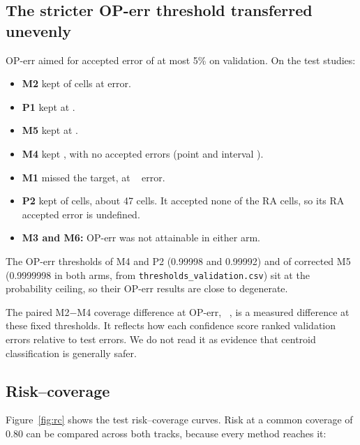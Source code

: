\documentclass[11pt]{article}
\begin{document}
\subsection{The stricter OP-err threshold transferred unevenly}

OP-err aimed for accepted error of at most 5\% on validation. On the test studies:
\begin{itemize}
\item \textbf{M2} kept  of cells at  error.
\item \textbf{P1} kept  at .
\item \textbf{M5} kept  at .
\item \textbf{M4} kept , with no accepted errors (point and interval ).
\item \textbf{M1} missed the target, at ~ error.
\item \textbf{P2} kept  of cells, about 47 cells. It accepted none of the RA cells, so its RA accepted error is undefined.
\item \textbf{M3 and M6:} OP-err was not attainable in either arm.
\end{itemize}
The OP-err thresholds of M4 and P2 (0.99998 and 0.99992) and of corrected M5 (0.9999998 in both arms, from \nolinkurl{thresholds_validation.csv}) sit at the probability ceiling, so their OP-err results are close to degenerate.

The paired M2$-$M4 coverage difference at OP-err, ~, is a measured difference at these fixed thresholds. It reflects how each confidence score ranked validation errors relative to test errors. We do not read it as evidence that centroid classification is generally safer.

\subsection{Risk--coverage}\label{sec:rc}

Figure~\ref{fig:rc} shows the test risk--coverage curves. Risk at a common coverage of 0.80 can be compared across both tracks, because every method reaches it:
\end{document}
